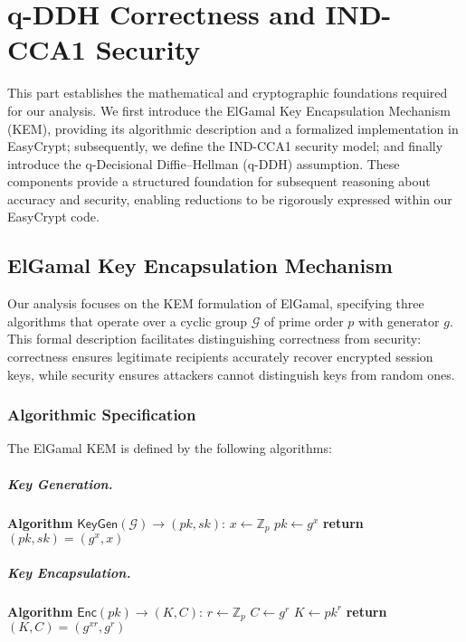 \chapter{q-DDH Correctness and IND-CCA1 Security}
\label{sec:qddh-indcca1-security}

This part establishes the mathematical and cryptographic foundations required for our analysis. We first introduce the ElGamal Key Encapsulation Mechanism (KEM), providing its algorithmic description and a formalized implementation in EasyCrypt; subsequently, we define the IND-CCA1 security model; and finally introduce the q-Decisional Diffie–Hellman (q-DDH) assumption. These components provide a structured foundation for subsequent reasoning about accuracy and security, enabling reductions to be rigorously expressed within our EasyCrypt code.

\section{ElGamal Key Encapsulation Mechanism}
\label{sec:elgamal-kem}
Our analysis focuses on the KEM formulation of ElGamal, specifying three algorithms that operate over a cyclic group $\mathcal{G}$ of prime order $p$ with generator $g$. This formal description facilitates distinguishing correctness from security: correctness ensures legitimate recipients accurately recover encrypted session keys, while security ensures attackers cannot distinguish keys from random ones.

\subsection{Algorithmic Specification}

The ElGamal KEM is defined by the following algorithms:

\paragraph{Key Generation.}
\begin{algorithmic}[1]
\STATE \textbf{Algorithm} $\mathsf{KeyGen}(\mathcal{G}) \rightarrow (pk, sk)$:
\STATE $x \leftarrow \mathbb{Z}_p$ 
\STATE $pk \leftarrow g^x$ 
\STATE \textbf{return} $(pk, sk) = (g^x, x)$
\end{algorithmic}

\paragraph{Key Encapsulation.}
\begin{algorithmic}[1]
\STATE \textbf{Algorithm} $\mathsf{Enc}(pk) \rightarrow (K, C)$:
\STATE $r \leftarrow \mathbb{Z}_p$ 
\STATE $C \leftarrow g^r$ 
\STATE $K \leftarrow pk^r$ 
\STATE \textbf{return} $(K, C) = (g^{xr}, g^r)$
\end{algorithmic}

